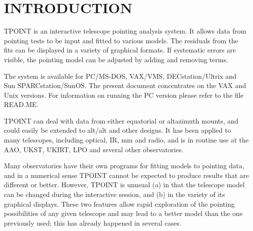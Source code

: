 \newcommand{\fstring}[1]{\hbox{\hspace{0.05em}$'${\tt#1}\hspace{0.05em}$'$}}

\renewcommand{\_}{{\tt\char'137}}

\newpage

\section{INTRODUCTION}
TPOINT is an interactive telescope pointing analysis system.  It
allows data from pointing tests to be input and fitted to various
models.  The residuals from the fits can be displayed in a
variety of graphical formats.  If systematic errors are visible,
the pointing model can be adjusted by adding and removing terms.

The system is available for PC/MS-DOS, VAX/VMS, DECstation/Ultrix
and Sun SPARCstation/SunOS.  The present document concentrates on the VAX
and Unix versions.  For information on running the PC version please
refer to the file READ.ME.

TPOINT can deal with data from either equatorial
or altazimuth mounts, and could easily be extended to alt/alt and
other designs.  It has been applied to many telescopes, including
optical, IR, mm and radio, and is in routine use at the
AAO, UKST, UKIRT, LPO and several other observatories.

Many observatories have their own programs for fitting models
to pointing data, and in a numerical sense TPOINT cannot be
expected to produce
results that are different or better.  However, TPOINT is unusual
(a) in that the telescope model can be changed during the interactive
session, and (b) in the variety of its graphical displays.
These two features allow rapid exploration of the pointing possibilities
of any given telescope and may lead to a better model than the one
previously used; this has already happened in several cases.


